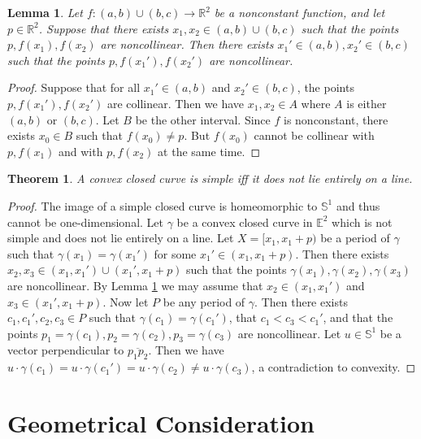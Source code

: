 \documentclass{amsart}
\newtheorem{lemma}[proposition]{Lemma}
\newtheorem{theorem}[proposition]{Theorem}
\theoremstyle{definition}
\theoremstyle{remark}
\begin{document}
\begin{lemma}
    \label{lem}
    Let $f:(a,b)\cup(b,c)\to\mathbb{R}^2$ be a
    nonconstant function, and let $p\in\mathbb{R}^2$.
    Suppose that there exists $x_1,x_2\in(a,b)\cup(b,c)$ such that
    the points $p,f(x_1),f(x_2)$ are noncollinear.
    Then there exists $x_1'\in(a,b),x_2'\in(b,c)$ such that
    the points $p,f(x_1'),f(x_2')$ are noncollinear.
\end{lemma}

\begin{proof}
    Suppose that for all $x_1'\in(a,b)$ and $x_2'\in(b,c)$,
    the points $p,f(x_1'),f(x_2')$ are collinear.
    Then we have $x_1,x_2\in A$ where
    $A$ is either $(a,b)$ or $(b,c)$. Let $B$ be the other interval.
    Since $f$ is nonconstant, there exists $x_0\in B$
    such that $f(x_0)\ne p$. But $f(x_0)$ cannot be collinear
    with $p,f(x_1)$ and with $p,f(x_2)$ at the same time.
\end{proof}

\begin{theorem}
    \label{thm:main}
    A convex closed curve is simple iff
    it does not lie entirely on a line.
\end{theorem}

\begin{proof}
    The image of a simple closed curve is homeomorphic to
    $\mathbb{S}^1$ and thus cannot be one-dimensional.
    Let $\gamma$ be a convex closed curve in $\mathbb{E}^2$
    which is not simple and does not lie entirely on a line.
    Let $X=[x_1,x_1+p)$ be a period of $\gamma$ such that
    $\gamma(x_1)=\gamma(x_1')$ for some $x_1'\in(x_1,x_1+p)$.
    Then there exists $x_2,x_3\in(x_1,x_1')\cup(x_1',x_1+p)$
    such that the points $\gamma(x_1),\gamma(x_2),\gamma(x_3)$ are
    noncollinear. By Lemma \ref{lem} we may assume that
    $x_2\in(x_1,x_1')$ and $x_3\in(x_1',x_1+p)$.
    Now let $P$ be any period of $\gamma$. Then there exists
    $c_1,c_1',c_2,c_3\in P$ such that $\gamma(c_1)=\gamma(c_1')$,
    that $c_1<c_3<c_1'$, and that the points
    $p_1=\gamma(c_1),p_2=\gamma(c_2),p_3=\gamma(c_3)$ are noncollinear.
    Let $u\in\mathbb{S}^1$ be a vector perpendicular to
    $\overline{p_1p_2}$. Then we have
    $u\cdot\gamma(c_1)=u\cdot\gamma(c_1')=u\cdot\gamma(c_2)
        \ne u\cdot\gamma(c_3)$, a contradiction to convexity.
\end{proof}

\section{Geometrical Consideration}
\end{document}
